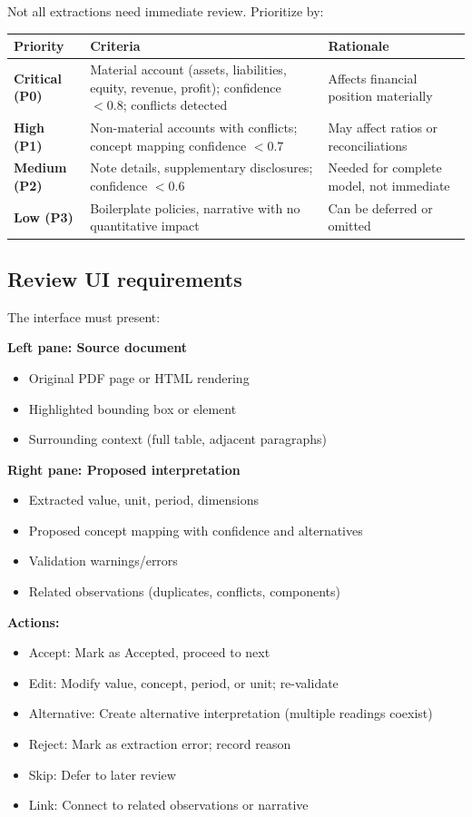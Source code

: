 Not all extractions need immediate review. Prioritize by:

\begin{longtable}{L{40mm}L{40mm}L{56mm}}
\toprule Priority & Criteria & Rationale\\\midrule\endhead
\textbf{Critical (P0)} & Material account (assets, liabilities, equity, revenue,
profit); confidence $<0.8$; conflicts detected & Affects financial position materially\\
\textbf{High (P1)} & Non-material accounts with conflicts; concept mapping
confidence $<0.7$ & May affect ratios or reconciliations\\
\textbf{Medium (P2)} & Note details, supplementary disclosures; confidence $<0.6$ &
Needed for complete model, not immediate\\
\textbf{Low (P3)} & Boilerplate policies, narrative with no quantitative impact &
Can be deferred or omitted\\
\bottomrule
\end{longtable}

\subsection{Review UI requirements}

The interface must present:

\textbf{Left pane: Source document}
\begin{itemize}
\item Original PDF page or HTML rendering
\item Highlighted bounding box or element
\item Surrounding context (full table, adjacent paragraphs)
\end{itemize}

\textbf{Right pane: Proposed interpretation}
\begin{itemize}
\item Extracted value, unit, period, dimensions
\item Proposed concept mapping with confidence and alternatives
\item Validation warnings/errors
\item Related observations (duplicates, conflicts, components)
\end{itemize}

\textbf{Actions:}
\begin{itemize}
\item Accept: Mark as Accepted, proceed to next
\item Edit: Modify value, concept, period, or unit; re-validate
\item Alternative: Create alternative interpretation (multiple readings coexist)
\item Reject: Mark as extraction error; record reason
\item Skip: Defer to later review
\item Link: Connect to related observations or narrative
\end{itemize}

